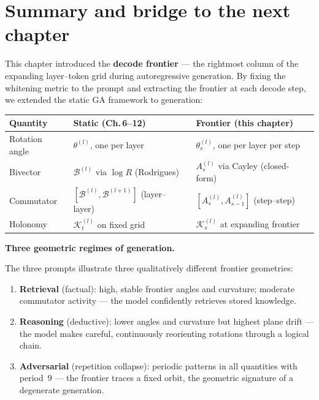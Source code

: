 \documentclass[11pt, twoside, openright]{memoir}
\newcommand{\bivec}[1]{\mathcal{B}^{(#1)}}  %
\numberwithin{equation}{chapter}
\begin{document}
\section{Summary and bridge to the next chapter}
\label{sec:frontier-summary}

This chapter introduced the \textbf{decode frontier} --- the
rightmost column of the expanding layer--token grid during
autoregressive generation.  By fixing the whitening metric to the
prompt and extracting the frontier at each decode step, we
extended the static GA framework to generation:

\begin{center}
\renewcommand{\arraystretch}{1.4}\small
\begin{tabular}{@{}L{3.2cm} L{4.5cm} L{4.5cm}@{}}
\toprule
\textbf{Quantity} & \textbf{Static (Ch.\,6--12)} &
  \textbf{Frontier (this chapter)} \\
\midrule
Rotation angle &
  $\theta^{(l)}$, one per layer &
  $\theta^{(l)}_s$, one per layer per step \\
Bivector &
  $\bivec{l}$ via $\log R$ (Rodrigues) &
  $A^{(l)}_s$ via Cayley (closed-form) \\
Commutator &
  $[\bivec{l}, \bivec{l+1}]$ (layer--layer) &
  $[A^{(l)}_s, A^{(l)}_{s-1}]$ (step--step) \\
Holonomy &
  $\mathcal{K}^{(l)}_t$ on fixed grid &
  $\mathcal{K}^{(l)}_s$ at expanding frontier \\
\bottomrule
\end{tabular}
\end{center}

\begin{keyidea}
\textbf{Three geometric regimes of generation.}

The three prompts illustrate three qualitatively different frontier
geometries:

\begin{enumerate}[nosep]
\item \textbf{Retrieval} (factual): high, stable frontier angles
  and curvature; moderate commutator activity --- the model
  confidently retrieves stored knowledge.
\item \textbf{Reasoning} (deductive): lower angles and curvature
  but highest plane drift --- the model makes careful, continuously
  reorienting rotations through a logical chain.
\item \textbf{Adversarial} (repetition collapse): periodic
  patterns in all quantities with period~9 --- the frontier traces
  a fixed orbit, the geometric signature of a degenerate
  generation.
\end{enumerate}
\end{keyidea}
\end{document}
